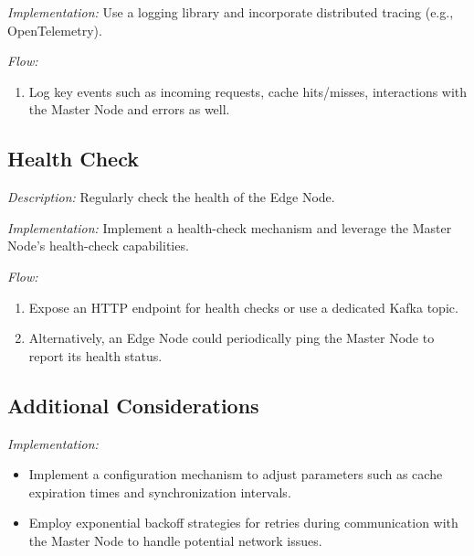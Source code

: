 \documentclass{article}
\begin{document}
  \textit{Implementation:} Use a logging library and incorporate distributed tracing (e.g., OpenTelemetry).

  \textit{Flow:}
  \begin{enumerate}[label=\arabic*.]
    \item Log key events such as incoming requests, cache hits/misses, interactions with the Master Node and errors as well.
  \end{enumerate}


  \subsection{Health Check}
  \textit{Description:} Regularly check the health of the Edge Node.

  \textit{Implementation:} Implement a health-check mechanism and leverage the Master Node's health-check capabilities.

  \textit{Flow:}
  \begin{enumerate}[label=\arabic*.]
    \item Expose an HTTP endpoint for health checks or use a dedicated Kafka topic.
    \item Alternatively, an Edge Node could periodically ping the Master Node to report its health status.
  \end{enumerate}


  \subsection{Additional Considerations}

  \textit{Implementation:}
  \begin{itemize}
    \item Implement a configuration mechanism to adjust parameters such as cache expiration times and synchronization
    intervals.
    \item Employ exponential backoff strategies for retries during communication with the Master Node to handle
    potential network issues.
  \end{itemize}
\end{document}
